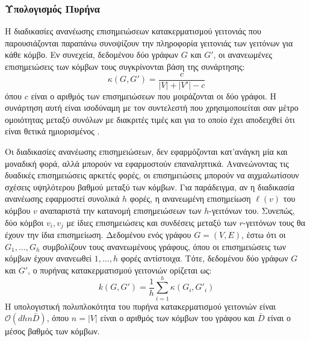 \subsubsection{Υπολογισμός Πυρήνα}
Η διαδικασίες ανανέωσης επισημειώσεων κατακερματισμού γειτονιάς που παρουσιάζονται παραπάνω συνοψίζουν την πληροφορία γειτονιάς των γειτόνων για κάθε κόμβο.
Εν συνεχεία, δεδομένου δύο γράφων $G$ και $G'$, οι ανανεωμένες επισημειώσεις των κόμβων τους συγκρίνονται βάση της συνάρτησης:
\begin{equation}
    \kappa(G, G') = \frac{c}{|V| + |V'| - c}
\end{equation}
όπου $c$ είναι ο αριθμός των επισημειώσεων που μοιράζονται οι δύο γράφοι.
Η συνάρτηση αυτή είναι ισοδύναμη με τον συντελεστή \textit{} που χρησιμοποιείται σαν μέτρο ομοιότητας μεταξύ συνόλων με διακριτές τιμές και για το οποίο έχει αποδειχθεί ότι είναι θετικά ημιορισμένος \cite{gower1971general}.\par
Οι διαδικασίες ανανέωσης επισημειώσεων, δεν εφαρμόζονται κατ'ανάγκη μία και μοναδική φορά, αλλά μπορούν να εφαρμοστούν επαναληπτικά.
Ανανεώνοντας τις δυαδικές επισημειώσεις αρκετές φορές, οι επισημειώσεις μπορούν να αιχμαλωτίσουν σχέσεις υψηλότερου βαθμού μεταξύ των κόμβων.
Για παράδειγμα, αν η διαδικασία ανανέωσης εφαρμοστεί συνολικά $h$ φορές, η ανανεωμένη επισημείωση $\ell(v)$ του κόμβου $v$ αναπαριστά την κατανομή επισημειώσεων των $h$-γειτόνων του.
Συνεπώς, δύο κόμβοι $v_i, v_j$ με ίδιες επισημειώσεις και συνδέσεις μεταξύ των $r$-γειτόνων τους θα έχουν την ίδια επισημείωση.
Δεδομένου ενός γράφου $G=(V,E)$, έστω ότι οι $G_1, \ldots, G_h$ συμβολίζουν τους ανανεωμένους γράφους, όπου οι επισημειώσεις των κόμβων έχουν ανανεωθεί $1,\ldots,h$ φορές αντίστοιχα.
Τότε, δεδομένου δύο γράφων $G$ και $G'$, ο πυρήνας κατακερματισμού γειτονιών ορίζεται ως:
\begin{equation}
    k(G, G') = \frac{1}{h} \sum_{i=1}^h \kappa(G_i, G'_i)
\label{eq:framework_sum}
\end{equation}
Η υπολογιστική πολυπλοκότητα του πυρήνα κατακερματισμού γειτονιών είναι $\mathcal{O}(dhn\bar{D})$, όπου $n=|V|$ είναι ο αριθμός των κόμβων του γράφου και $\bar{D}$ είναι ο μέσος βαθμός των κόμβων.

